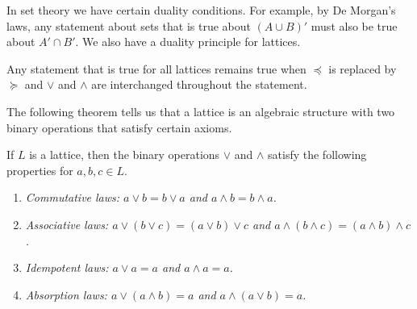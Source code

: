  
\medskip
 
 
In set theory we have certain duality conditions. For example, by De
Morgan's laws, any statement about sets that is true about $(A \cup
B)'$ must also be true about $A' \cap B'$. We also have a duality
principle for lattices. 
 
 
\medskip
 
 
Any statement that is true for all lattices remains true when
$\preceq$ is replaced by $\succeq$ and $\vee$ and $\wedge$ are
interchanged throughout the statement.
 
 
\medskip
 
 
The following theorem tells us that a lattice is an algebraic
structure with two binary operations that satisfy certain
axioms.						     
 
 
\begin{theorem}
If $L$ is a lattice, then the binary operations $\vee$ and $\wedge$
satisfy the following properties for $a, b, c \in L$.
\begin{enumerate}
 
\rm \item \it
Commutative laws: $a \vee b = b \vee a$ and $a \wedge b = b \wedge a$.
 
\rm \item \it
Associative laws: $a \vee ( b \vee c) = (a \vee b) \vee c$ and $a \wedge (
b \wedge c) = (a \wedge b) \wedge c$. 
 
\rm \item \it
Idempotent laws: $a \vee a = a$ and $a \wedge a = a$.
 
\rm \item \it
Absorption laws: $a \vee (a \wedge b) = a$ and $a \wedge ( a \vee b ) =a$.
 
\end{enumerate}
\end{theorem}
 
